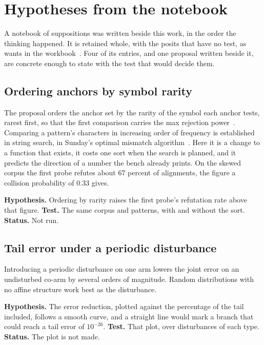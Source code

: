 \chapter{Hypotheses from the notebook}

A notebook of suppositions was written beside this work, in the order the thinking happened. It is retained
whole, with the posits that have no test, as wants in the workbook~\cite{src:Quigg-orior-workbook}.
Four of its entries, and one proposal written beside it, are concrete enough to state with the test
that would decide them.

\section{Ordering anchors by symbol rarity}

The proposal orders the anchor set by the rarity of the symbol each anchor tests, rarest first, so
that the first comparison carries the max rejection power~\cite{src:Quigg-delta-null}. Comparing a
pattern's characters in increasing order of frequency is established in string search, in Sunday's
optimal mismatch algorithm~\cite{src:Sunday-1990}. Here it is a change
to a function that exists, it costs one sort when the search is planned, and it predicts the direction
of a number the bench already prints. On the skewed corpus the first probe refutes about 67 percent of
alignments, the figure a collision probability of 0.33 gives.

\textbf{Hypothesis.} Ordering by rarity raises the first probe's refutation rate above that figure.
\textbf{Test.} The same corpus and patterns, with and without the sort. \textbf{Status.} Not run.

\section{Tail error under a periodic disturbance}

Introducing a periodic disturbance on one arm lowers the joint error on an undisturbed co-arm by
several orders of magnitude. Random distributions with no affine structure work best as the
disturbance.

\textbf{Hypothesis.} The error reduction, plotted against the percentage of the tail included, follows
a smooth curve, and a straight line would mark a branch that could reach a tail error of \(10^{-26}\).
\textbf{Test.} That plot, over disturbances of each type. \textbf{Status.} The plot is not made.

